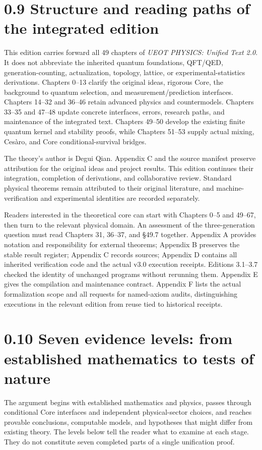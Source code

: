 \documentclass[
  11pt,
  oneside]{book}
\begin{document}
\section{0.9 Structure and reading paths of the integrated edition}

This edition carries forward all 49 chapters of \emph{UEOT PHYSICS:
Unified Text 2.0}. It does not abbreviate the inherited quantum
foundations, QFT/QED, generation-counting, actualization, topology,
lattice, or experimental-statistics derivations. Chapters 0--13 clarify
the original ideas, rigorous Core, the background to quantum selection,
and measurement/prediction interfaces. Chapters 14--32 and 36--46 retain
advanced physics and countermodels. Chapters 33--35 and 47--48 update
concrete interfaces, errors, research paths, and maintenance of the
integrated text. Chapters 49--50 develop the existing finite quantum
kernel and stability proofs, while Chapters 51--53 supply actual mixing,
Cesàro, and Core conditional-survival bridges.

The theory's author is Degui Qian. Appendix C and the source manifest
preserve attribution for the original ideas and project results. This
edition continues their integration, completion of derivations, and
collaborative review. Standard physical theorems remain attributed to
their original literature, and machine-verification and experimental
identities are recorded separately.

Readers interested in the theoretical core can start with Chapters 0--5
and 49--67, then turn to the relevant physical domain. An assessment of
the three-generation question must read Chapters 31, 36--37, and §49.7
together. Appendix A provides notation and responsibility for external
theorems; Appendix B preserves the stable result register; Appendix C
records sources; Appendix D contains all inherited verification code and
the actual v3.0 execution receipts. Editions 3.1--3.7 checked the
identity of unchanged programs without rerunning them. Appendix E gives
the compilation and maintenance contract. Appendix F lists the actual
formalization scope and all requests for named-axiom audits,
distinguishing executions in the relevant edition from reuse tied to
historical receipts.

\section{0.10 Seven evidence levels: from established mathematics to
tests of nature}

The argument begins with established mathematics and physics, passes
through conditional Core interfaces and independent physical-sector
choices, and reaches provable conclusions, computable models, and
hypotheses that might differ from existing theory. The levels below tell
the reader what to examine at each stage. They do not constitute seven
completed parts of a single unification proof.
\end{document}
